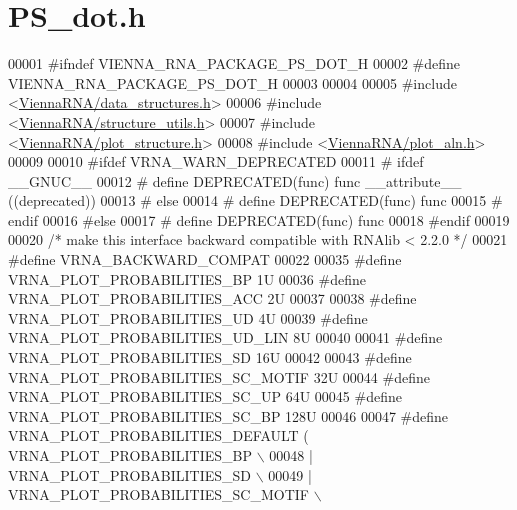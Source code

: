 \hypertarget{PS__dot_8h_source}{}\section{P\+S\+\_\+dot.\+h}
\label{PS__dot_8h_source}

\begin{DoxyCode}
00001 \textcolor{preprocessor}{#ifndef VIENNA\_RNA\_PACKAGE\_PS\_DOT\_H}
00002 \textcolor{preprocessor}{#define VIENNA\_RNA\_PACKAGE\_PS\_DOT\_H}
00003 
00004 
00005 \textcolor{preprocessor}{#include <\hyperlink{data__structures_8h}{ViennaRNA/data\_structures.h}>}
00006 \textcolor{preprocessor}{#include <\hyperlink{structure__utils_8h}{ViennaRNA/structure\_utils.h}>}
00007 \textcolor{preprocessor}{#include <\hyperlink{plot__structure_8h}{ViennaRNA/plot\_structure.h}>}
00008 \textcolor{preprocessor}{#include <\hyperlink{plot__aln_8h}{ViennaRNA/plot\_aln.h}>}
00009 
00010 \textcolor{preprocessor}{#ifdef VRNA\_WARN\_DEPRECATED}
00011 \textcolor{preprocessor}{# ifdef \_\_GNUC\_\_}
00012 \textcolor{preprocessor}{#  define DEPRECATED(func) func \_\_attribute\_\_ ((deprecated))}
00013 \textcolor{preprocessor}{# else}
00014 \textcolor{preprocessor}{#  define DEPRECATED(func) func}
00015 \textcolor{preprocessor}{# endif}
00016 \textcolor{preprocessor}{#else}
00017 \textcolor{preprocessor}{# define DEPRECATED(func) func}
00018 \textcolor{preprocessor}{#endif}
00019 
00020 \textcolor{comment}{/* make this interface backward compatible with RNAlib < 2.2.0 */}
00021 \textcolor{preprocessor}{#define VRNA\_BACKWARD\_COMPAT}
00022 
00035 \textcolor{preprocessor}{#define VRNA\_PLOT\_PROBABILITIES\_BP        1U}
00036 \textcolor{preprocessor}{#define VRNA\_PLOT\_PROBABILITIES\_ACC       2U}
00037 
00038 \textcolor{preprocessor}{#define VRNA\_PLOT\_PROBABILITIES\_UD        4U}
00039 \textcolor{preprocessor}{#define VRNA\_PLOT\_PROBABILITIES\_UD\_LIN    8U}
00040 
00041 \textcolor{preprocessor}{#define VRNA\_PLOT\_PROBABILITIES\_SD        16U}
00042 
00043 \textcolor{preprocessor}{#define VRNA\_PLOT\_PROBABILITIES\_SC\_MOTIF  32U}
00044 \textcolor{preprocessor}{#define VRNA\_PLOT\_PROBABILITIES\_SC\_UP     64U}
00045 \textcolor{preprocessor}{#define VRNA\_PLOT\_PROBABILITIES\_SC\_BP     128U}
00046 
00047 \textcolor{preprocessor}{#define VRNA\_PLOT\_PROBABILITIES\_DEFAULT   (   VRNA\_PLOT\_PROBABILITIES\_BP \(\backslash\)}
00048 \textcolor{preprocessor}{                                            | VRNA\_PLOT\_PROBABILITIES\_SD \(\backslash\)}
00049 \textcolor{preprocessor}{                                            | VRNA\_PLOT\_PROBABILITIES\_SC\_MOTIF \(\backslash\)}

\end{DoxyCode}
